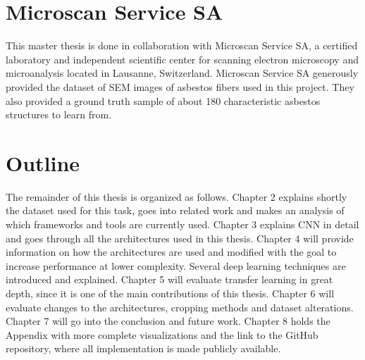 \newpage

\section{Microscan Service SA}

This master thesis is done in collaboration with Microscan Service SA, a certified laboratory and independent scientific center for scanning electron microscopy and microanalysis located in Lausanne, Switzerland. Microscan Service SA generously provided the dataset of SEM images of asbestos fibers used in this project. They also provided a ground truth sample of about 180 characteristic asbestos structures to learn from.

\section{Outline}

The remainder of this thesis is organized as follows. Chapter 2 explains shortly the dataset used for this task, goes into related work and makes an analysis of which frameworks and tools are currently used. Chapter 3 explains CNN in detail and goes through all the architectures used in this thesis. Chapter 4 will provide information on how the architectures are used and modified with the goal to increase performance at lower complexity. Several deep learning techniques are introduced and explained. Chapter 5 will evaluate transfer learning in great depth, since it is one of the main contributions of this thesis. Chapter 6 will evaluate changes to the architectures, cropping methods and dataset alterations. Chapter 7 will go into the conclusion and future work. Chapter 8 holds the Appendix with more complete visualizations and the link to the GitHub repository, where all implementation is made publicly available.\\

